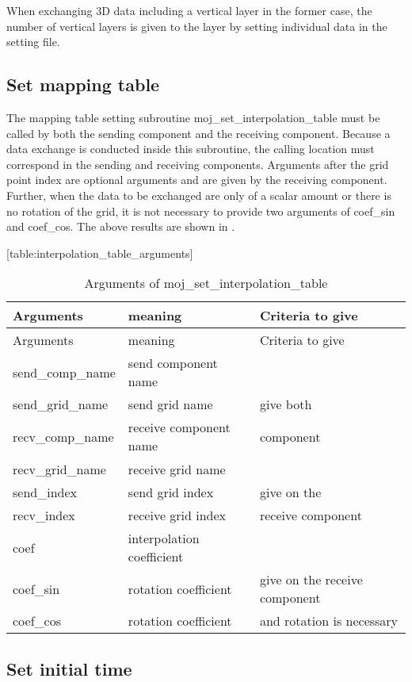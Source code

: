 When exchanging 3D data including a vertical layer in the former case,
the number of vertical layers is given to the layer by setting
individual data in the setting file.

\hypertarget{set-mapping-table}{%
\subsection{Set mapping table}\label{set-mapping-table}}

The mapping table setting subroutine moj\_set\_interpolation\_table must
be called by both the sending component and the receiving component.
Because a data exchange is conducted inside this subroutine, the calling
location must correspond in the sending and receiving components.
Arguments after the grid point index are optional arguments and are
given by the receiving component. Further, when the data to be exchanged
are only of a scalar amount or there is no rotation of the grid, it is
not necessary to provide two arguments of coef\_sin and coef\_cos. The
above results are shown in .

\protect\hypertarget{table:interpolation_table_arguments}{}{{[}table:interpolation\_table\_arguments{]}}

\hypertarget{table:interpolation_table_arguments}{}
\begin{longtable}[]{@{}lll@{}}
\caption{Arguments of moj\_set\_interpolation\_table}\tabularnewline
\toprule
Arguments & meaning & Criteria to give　\tabularnewline
\midrule
\endfirsthead
\toprule
Arguments & meaning & Criteria to give　\tabularnewline
\midrule
\endhead
send\_comp\_name & send component name &\tabularnewline
send\_grid\_name & send grid name & give both\tabularnewline
recv\_comp\_name & receive component name & component\tabularnewline
recv\_grid\_name & receive grid name & 　\tabularnewline
send\_index & send grid index & give on the\tabularnewline
recv\_index & receive grid index & receive component\tabularnewline
coef & interpolation coefficient &\tabularnewline
coef\_sin & rotation coefficient & give on the receive
component\tabularnewline
coef\_cos & rotation coefficient & and rotation is
necessary\tabularnewline
\bottomrule
\end{longtable}

\hypertarget{set-initial-time}{%
\subsection{Set initial time}\label{set-initial-time}}

